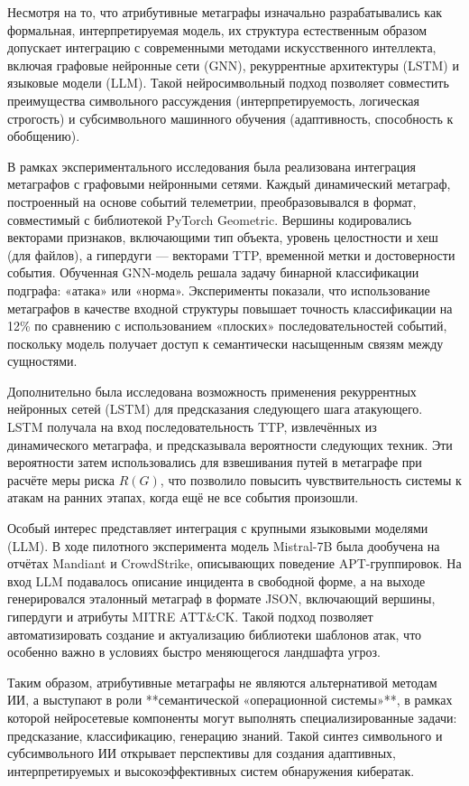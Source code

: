 \documentclass{article}
\begin{document}
Несмотря на то, что атрибутивные метаграфы изначально разрабатывались как формальная, интерпретируемая модель, их структура естественным образом допускает интеграцию с современными методами искусственного интеллекта, включая графовые нейронные сети (GNN), рекуррентные архитектуры (LSTM) и языковые модели (LLM). Такой нейросимвольный подход позволяет совместить преимущества символьного рассуждения (интерпретируемость, логическая строгость) и субсимвольного машинного обучения (адаптивность, способность к обобщению).

В рамках экспериментального исследования была реализована интеграция метаграфов с графовыми нейронными сетями. Каждый динамический метаграф, построенный на основе событий телеметрии, преобразовывался в формат, совместимый с библиотекой PyTorch Geometric. Вершины кодировались векторами признаков, включающими тип объекта, уровень целостности и хеш (для файлов), а гипердуги — векторами TTP, временной метки и достоверности события. Обученная GNN-модель решала задачу бинарной классификации подграфа: «атака» или «норма». Эксперименты показали, что использование метаграфов в качестве входной структуры повышает точность классификации на 12\% по сравнению с использованием «плоских» последовательностей событий, поскольку модель получает доступ к семантически насыщенным связям между сущностями.

Дополнительно была исследована возможность применения рекуррентных нейронных сетей (LSTM) для предсказания следующего шага атакующего. LSTM получала на вход последовательность TTP, извлечённых из динамического метаграфа, и предсказывала вероятности следующих техник. Эти вероятности затем использовались для взвешивания путей в метаграфе при расчёте меры риска $R(G)$, что позволило повысить чувствительность системы к атакам на ранних этапах, когда ещё не все события произошли.

Особый интерес представляет интеграция с крупными языковыми моделями (LLM). В ходе пилотного эксперимента модель Mistral-7B была дообучена на отчётах Mandiant и CrowdStrike, описывающих поведение APT-группировок. На вход LLM подавалось описание инцидента в свободной форме, а на выходе генерировался эталонный метаграф в формате JSON, включающий вершины, гипердуги и атрибуты MITRE ATT\&CK. Такой подход позволяет автоматизировать создание и актуализацию библиотеки шаблонов атак, что особенно важно в условиях быстро меняющегося ландшафта угроз.

Таким образом, атрибутивные метаграфы не являются альтернативой методам ИИ, а выступают в роли **семантической «операционной системы»**, в рамках которой нейросетевые компоненты могут выполнять специализированные задачи: предсказание, классификацию, генерацию знаний. Такой синтез символьного и субсимвольного ИИ открывает перспективы для создания адаптивных, интерпретируемых и высокоэффективных систем обнаружения кибератак.
\end{document}
